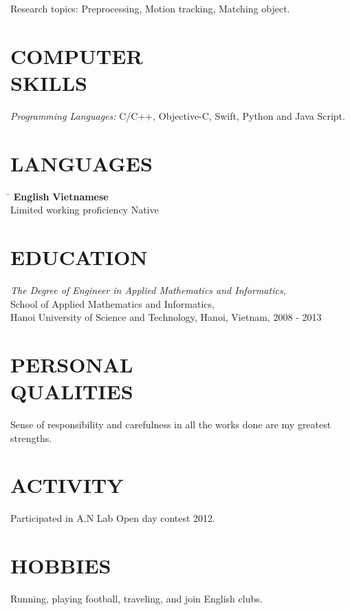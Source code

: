 \documentclass[margin, 10pt]{res}
\begin{document}
\begin{resume}
\begin{itemize}
   \end{itemize}
   Research topics: Preprocessing, Motion tracking, Matching object.
	
\section{COMPUTER \\ SKILLS}
   {\sl Programming Languages:} C/C++, Objective-C, Swift, Python and Java Script.\\


\section{LANGUAGES}
	\vspace{-0.1in}
	\begin{tabbing}
    \hspace{2.8in}\= \kill %
    \textbf{English}            \> \textbf{Vietnamese}\\
    Limited working proficiency \> Native\\
	\end{tabbing}\vspace{-20pt}
	
\section{EDUCATION}
   {\sl The Degree of Engineer in Applied Mathematics and Informatics,}\\
   School of Applied Mathematics and Informatics, \\
   Hanoi University of Science and Technology, Hanoi, Vietnam, 2008 - 2013 \\
	
\section{PERSONAL \\ QUALITIES} Sense of responsibility and carefulness in all the works done are my greatest strengths.\\
 
\section{ACTIVITY} Participated in A.N Lab Open day contest 2012.

\section{HOBBIES} Running, playing football, traveling, and join English clubs.

\end{resume}
\end{document}
